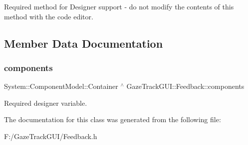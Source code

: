 Required method for Designer support -\/ do not modify the contents of this method with the code editor. 



\subsection{Member Data Documentation}
\mbox{\label{class_gaze_track_g_u_i_1_1_feedback_a26e51fa73149737460c9a20e9be9dfe2}} 
\subsubsection{\texorpdfstring{components}{components}}
{\footnotesize\ttfamily System\+::\+Component\+Model\+::\+Container $^\wedge$ Gaze\+Track\+G\+U\+I\+::\+Feedback\+::components\hspace{0.3cm}{\ttfamily [private]}}



Required designer variable. 



The documentation for this class was generated from the following file\+:\begin{DoxyCompactItemize}
\item 
F\+:/\+Gaze\+Track\+G\+U\+I/Feedback.\+h\end{DoxyCompactItemize}
